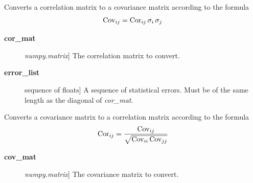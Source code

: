 \documentclass[a4paper,10pt,english]{sphinxmanual}
\begin{document}

\begin{fulllineitems}
\label{index:kafe.numeric_tools.cor_to_cov}
Converts a correlation matrix to a covariance matrix according to the
formula
\begin{gather}
\begin{split}\text{Cov}_{ij} = \text{Cor}_{ij}\, \sigma_i \, \sigma_j\end{split}\notag
\end{gather}\begin{description}
\item[{\textbf{cor\_mat}}] \leavevmode{[}\emph{numpy.matrix}{]}
The correlation matrix to convert.

\item[{\textbf{error\_list}}] \leavevmode{[}sequence of floats{]}
A sequence of statistical errors. Must be of the same length
as the diagonal of \emph{cor\_mat}.

\end{description}

\end{fulllineitems}


\begin{fulllineitems}
\label{index:kafe.numeric_tools.cov_to_cor}
Converts a covariance matrix to a correlation matrix according to the
formula
\begin{gather}
\begin{split}\text{Cor}_{ij} = \frac{\text{Cov}_{ij}}
    {\sqrt{ \text{Cov}_{ii}\,\text{Cov}_{jj}}}\end{split}\notag
\end{gather}\begin{description}
\item[{\textbf{cov\_mat}}] \leavevmode{[}\emph{numpy.matrix}{]}
The covariance matrix to convert.

\end{description}

\end{fulllineitems}

\end{document}
